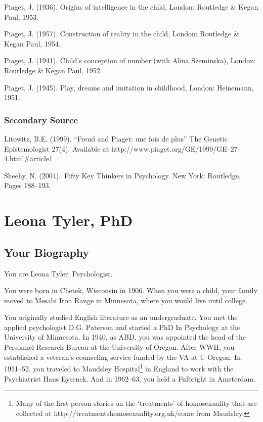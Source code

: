 \begin{refsection}
Piaget, J. (1936). Origins of intelligence in the child, London: Routledge \& Kegan Paul, 1953.

Piaget, J. (1957). Construction of reality in the child, London: Routledge \& Kegan Paul, 1954.

Piaget, J. (1941). Child's conception of number (with Alina Szeminska), London: Routledge \& Kegan Paul, 1952.

Piaget, J. (1945). Play, dreams and imitation in childhood, London: Heinemann, 1951.

\subsection{Secondary Source}
\label{secondarysource}

Litowitz, B.E. (1999). “Freud and Piaget: une fois de plus” The Genetic Epistemologist 27(4). Available at http:\slash \slash www.piaget.org\slash GE\slash 1999\slash GE--27--4.html\#article1

Sheehy, N. (2004). Fifty Key Thinkers in Psychology. New York: Routledge. Pages 188--193.

\chapter{Leona Tyler, PhD}
\label{leonatylerphd}

\section{Your Biography}
\label{yourbiography}

You are Leona Tyler, Psychologist.

You were born in Chetek, Wisconsin in 1906. When you were a child, your family moved to Mesabi Iron Range in Minnesota, where you would live until college.

You originally studied English literature as an undergraduate. You met the applied psychologist D.G. Paterson and started a PhD In Psychology at the University of Minnesota. In 1940, as ABD, you was appointed the head of the Personnel Research Bureau at the University of Oregon. After WWII, you established a veteran’s counseling service funded by the VA at U Oregon. In 1951--52, you traveled to Maudsley Hospital\footnote{Many of the first-person stories on the `treatments' of homosexuality that are collected at http:\slash \slash treatmentshomosexuality.org.uk\slash  come from Maudsley.} in England to work with the Psychiatrist Hans Eysenck. And in 1962--63, you held a Fulbright in Amsterdam.


\end{refsection}
